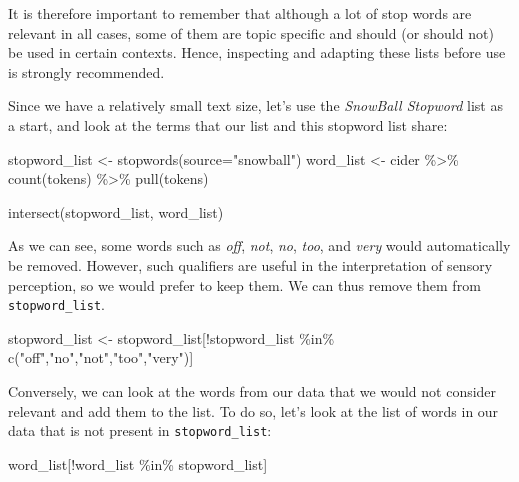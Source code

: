 \documentclass[
]{krantz}
\makeatletter
\newenvironment{Shaded}{\begin{snugshade}}{\end{snugshade}}
\newcommand{\AttributeTok}[1]{\textcolor[rgb]{0.61,0.61,0.61}{#1}}
\newcommand{\FunctionTok}[1]{\textcolor[rgb]{0,0,0}{#1}}
\newcommand{\NormalTok}[1]{#1}
\newcommand{\OtherTok}[1]{\textcolor[rgb]{0.37,0.37,0.37}{#1}}
\newcommand{\SpecialCharTok}[1]{\textcolor[rgb]{0,0,0}{#1}}
\newcommand{\StringTok}[1]{\textcolor[rgb]{0.5,0.5,0.5}{#1}}
\newenvironment{kframe}{%
\medskip{}
\setlength{\fboxsep}{.8em}
 \def\at@end@of@kframe{}%
 \ifinner\ifhmode%
  \def\at@end@of@kframe{\end{minipage}}%
  \begin{minipage}{\columnwidth}%
 \fi\fi%
 \def\FrameCommand##1{\hskip\@totalleftmargin \hskip-\fboxsep
 \colorbox{shadecolor}{##1}\hskip-\fboxsep
     \hskip-\linewidth \hskip-\@totalleftmargin \hskip\columnwidth}%
 \MakeFramed {\advance\hsize-\width
   \@totalleftmargin\z@ \linewidth\hsize
   \@setminipage}}%
 {\par\unskip\endMakeFramed%
 \at@end@of@kframe}
\renewenvironment{Shaded}{\begin{kframe}}{\end{kframe}}
\makeatother
\begin{document}
It is therefore important to remember that although a lot of stop words are relevant in all cases, some of them are topic specific and should (or should not) be used in certain contexts. Hence, inspecting and adapting these lists before use is strongly recommended.

Since we have a relatively small text size, let's use the \emph{SnowBall Stopword} list as a start, and look at the terms that our list and this stopword list share:

\begin{Shaded}
\begin{Highlighting}[]
\NormalTok{stopword\_list }\OtherTok{\textless{}{-}} \FunctionTok{stopwords}\NormalTok{(}\AttributeTok{source=}\StringTok{"snowball"}\NormalTok{)}
\NormalTok{word\_list }\OtherTok{\textless{}{-}}\NormalTok{ cider }\SpecialCharTok{\%\textgreater{}\%} 
  \FunctionTok{count}\NormalTok{(tokens) }\SpecialCharTok{\%\textgreater{}\%} 
  \FunctionTok{pull}\NormalTok{(tokens)}

\FunctionTok{intersect}\NormalTok{(stopword\_list, word\_list)}
\end{Highlighting}
\end{Shaded}

As we can see, some words such as \emph{off}, \emph{not}, \emph{no}, \emph{too}, and \emph{very} would automatically be removed. However, such qualifiers are useful in the interpretation of sensory perception, so we would prefer to keep them. We can thus remove them from \texttt{stopword\_list}.

\begin{Shaded}
\begin{Highlighting}[]
\NormalTok{stopword\_list }\OtherTok{\textless{}{-}}\NormalTok{ stopword\_list[}\SpecialCharTok{!}\NormalTok{stopword\_list }\SpecialCharTok{\%in\%} 
                                 \FunctionTok{c}\NormalTok{(}\StringTok{"off"}\NormalTok{,}\StringTok{"no"}\NormalTok{,}\StringTok{"not"}\NormalTok{,}\StringTok{"too"}\NormalTok{,}\StringTok{"very"}\NormalTok{)]}
\end{Highlighting}
\end{Shaded}

Conversely, we can look at the words from our data that we would not consider relevant and add them to the list. To do so, let's look at the list of words in our data that is not present in \texttt{stopword\_list}:

\begin{Shaded}
\begin{Highlighting}[]
\NormalTok{word\_list[}\SpecialCharTok{!}\NormalTok{word\_list }\SpecialCharTok{\%in\%}\NormalTok{ stopword\_list]}
\end{Highlighting}
\end{Shaded}
\end{document}
